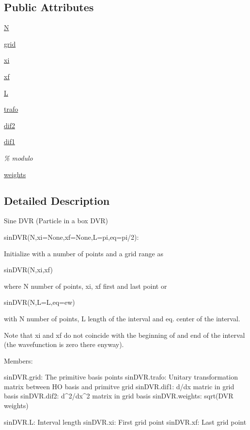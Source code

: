 \subsection*{Public Attributes}
\begin{DoxyCompactItemize}
\item 
\hyperlink{class_a_l_s_1_1dvr_1_1sin_d_v_r_a0226685f86d38c5759040db01bf97c8d}{N}
\item 
\hyperlink{class_a_l_s_1_1dvr_1_1sin_d_v_r_aa2bfbf09f3802c12a7dea88bcb12fd13}{grid}
\item 
\hyperlink{class_a_l_s_1_1dvr_1_1sin_d_v_r_ac38a455f10cba07aa10267031ba63660}{xi}
\item 
\hyperlink{class_a_l_s_1_1dvr_1_1sin_d_v_r_a56899b9dbc8f0b689e19ae424943ee65}{xf}
\item 
\hyperlink{class_a_l_s_1_1dvr_1_1sin_d_v_r_a765a9f901719aac9c36b40fdd066abfe}{L}
\item 
\hyperlink{class_a_l_s_1_1dvr_1_1sin_d_v_r_ad9b3cf1d979836a0cb5a4e8281fef616}{trafo}
\item 
\hyperlink{class_a_l_s_1_1dvr_1_1sin_d_v_r_a32687413b0d38869ee8ec7b4e56ff283}{dif2}
\item 
\hyperlink{class_a_l_s_1_1dvr_1_1sin_d_v_r_a98dd8b3cf96285a244df8aaececad513}{dif1}
\begin{DoxyCompactList}\small\item\em \% modulo \end{DoxyCompactList}\item 
\hyperlink{class_a_l_s_1_1dvr_1_1sin_d_v_r_a97ae3ccd62d903ba80f4b43756083933}{weights}
\end{DoxyCompactItemize}


\subsection{Detailed Description}
\begin{DoxyVerb}Sine DVR (Particle in a box DVR)

sinDVR(N,xi=None,xf=None,L=pi,eq=pi/2):

Initialize with a number of points and a grid range as 

    sinDVR(N,xi,xf)

where N number of points, xi, xf first and last point or

    sinDVR(N,L=L,eq=ew)

with N number of points, L length of the interval and eq.
center of the interval.


Note that xi and xf do not coincide with the beginning of
and end of the interval (the wavefunction is zero there
enyway). 


Members:

   sinDVR.grid:     The primitive basis points
   sinDVR.trafo:    Unitary transformation matrix between 
                    HO basis and primitve grid
   sinDVR.dif1:     d/dx matric in grid basis
   sinDVR.dif2:     d^2/dx^2 matrix in grid basis
   sinDVR.weights:  sqrt(DVR weights)

   sinDVR.L:        Interval length
   sinDVR.xi:       First grid point
   sinDVR.xf:       Last grid point\end{DoxyVerb}
 

